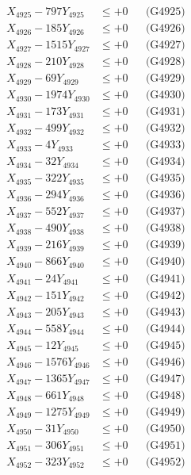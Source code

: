 \documentclass[a4paper,10pt]{article}
\begin{document}
{\begin{align}
X_{4925} - 797Y_{4925} &\leq +0 && \text{(G4925)} \\
X_{4926} - 185Y_{4926} &\leq +0 && \text{(G4926)} \\
X_{4927} - 1515Y_{4927} &\leq +0 && \text{(G4927)} \\
X_{4928} - 210Y_{4928} &\leq +0 && \text{(G4928)} \\
X_{4929} - 69Y_{4929} &\leq +0 && \text{(G4929)} \\
X_{4930} - 1974Y_{4930} &\leq +0 && \text{(G4930)} \\
\allowbreak
X_{4931} - 173Y_{4931} &\leq +0 && \text{(G4931)} \\
X_{4932} - 499Y_{4932} &\leq +0 && \text{(G4932)} \\
X_{4933} - 4Y_{4933} &\leq +0 && \text{(G4933)} \\
X_{4934} - 32Y_{4934} &\leq +0 && \text{(G4934)} \\
X_{4935} - 322Y_{4935} &\leq +0 && \text{(G4935)} \\
X_{4936} - 294Y_{4936} &\leq +0 && \text{(G4936)} \\
X_{4937} - 552Y_{4937} &\leq +0 && \text{(G4937)} \\
X_{4938} - 490Y_{4938} &\leq +0 && \text{(G4938)} \\
X_{4939} - 216Y_{4939} &\leq +0 && \text{(G4939)} \\
X_{4940} - 866Y_{4940} &\leq +0 && \text{(G4940)} \\
\allowbreak
X_{4941} - 24Y_{4941} &\leq +0 && \text{(G4941)} \\
X_{4942} - 151Y_{4942} &\leq +0 && \text{(G4942)} \\
X_{4943} - 205Y_{4943} &\leq +0 && \text{(G4943)} \\
X_{4944} - 558Y_{4944} &\leq +0 && \text{(G4944)} \\
X_{4945} - 12Y_{4945} &\leq +0 && \text{(G4945)} \\
X_{4946} - 1576Y_{4946} &\leq +0 && \text{(G4946)} \\
X_{4947} - 1365Y_{4947} &\leq +0 && \text{(G4947)} \\
X_{4948} - 661Y_{4948} &\leq +0 && \text{(G4948)} \\
X_{4949} - 1275Y_{4949} &\leq +0 && \text{(G4949)} \\
X_{4950} - 31Y_{4950} &\leq +0 && \text{(G4950)} \\
\allowbreak
X_{4951} - 306Y_{4951} &\leq +0 && \text{(G4951)} \\
X_{4952} - 323Y_{4952} &\leq +0 && \text{(G4952)} \\

\end{align}}
\end{document}

